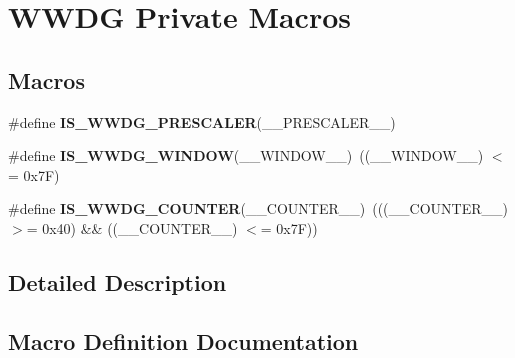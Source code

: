 \hypertarget{group___w_w_d_g___private___macros}{}\section{W\+W\+DG Private Macros}
\label{group___w_w_d_g___private___macros}
\subsection*{Macros}
\begin{DoxyCompactItemize}
\item 
\#define {\bfseries I\+S\+\_\+\+W\+W\+D\+G\+\_\+\+P\+R\+E\+S\+C\+A\+L\+ER}(\+\_\+\+\_\+\+P\+R\+E\+S\+C\+A\+L\+E\+R\+\_\+\+\_\+)
\item 
\#define {\bfseries I\+S\+\_\+\+W\+W\+D\+G\+\_\+\+W\+I\+N\+D\+OW}(\+\_\+\+\_\+\+W\+I\+N\+D\+O\+W\+\_\+\+\_\+)~((\+\_\+\+\_\+\+W\+I\+N\+D\+O\+W\+\_\+\+\_\+) $<$= 0x7\+F)\hypertarget{group___w_w_d_g___private___macros_ga2e7358bcfcc6df115466ebfd0ff55644}{}\label{group___w_w_d_g___private___macros_ga2e7358bcfcc6df115466ebfd0ff55644}

\item 
\#define {\bfseries I\+S\+\_\+\+W\+W\+D\+G\+\_\+\+C\+O\+U\+N\+T\+ER}(\+\_\+\+\_\+\+C\+O\+U\+N\+T\+E\+R\+\_\+\+\_\+)~(((\+\_\+\+\_\+\+C\+O\+U\+N\+T\+E\+R\+\_\+\+\_\+) $>$= 0x40) \&\& ((\+\_\+\+\_\+\+C\+O\+U\+N\+T\+E\+R\+\_\+\+\_\+) $<$= 0x7\+F))\hypertarget{group___w_w_d_g___private___macros_ga01304524b12741cc7c4fa1905f1945bd}{}\label{group___w_w_d_g___private___macros_ga01304524b12741cc7c4fa1905f1945bd}

\end{DoxyCompactItemize}


\subsection{Detailed Description}


\subsection{Macro Definition Documentation}
